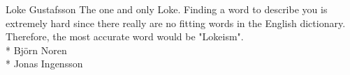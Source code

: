 \documentclass[main.tex]{subfiles}
\begin{document}
Loke Gustafsson 
\newline
The one and only Loke. Finding a word to describe you is extremely hard since there really are no fitting words in the English dictionary. Therefore, the most accurate word would be "Lokeism".
\newline
\\*
Björn Noren
\newline
\\*
Jonas Ingensson
\end{document}
